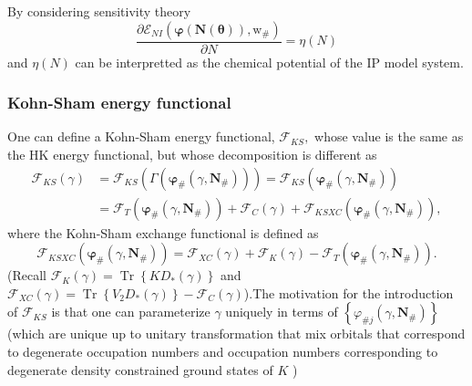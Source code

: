 \documentclass[aps,preprint]{revtex4}%
\begin{document}
By considering sensitivity theory
\begin{equation}
\frac{\partial\mathcal{E}_{NI}\left(  \mathbf{\varphi}\left(  \mathbf{N}%
\left(  \mathbf{\theta}\right)  \right)  \mathbf{,}\mathrm{w}_{\#}\right)
}{\partial N}=\eta\left(  N\right)
\end{equation}
and $\eta\left(  N\right)  $ can be interpretted as the chemical potential of
the IP model system.

\subsubsection{Kohn-Sham energy functional}

One can define a Kohn-Sham energy functional, $\mathcal{F}_{KS},$ whose value
is the same as the HK energy functional, but whose decomposition is different
as
\begin{align}
\mathcal{F}_{KS}\left(  \gamma\right)   &  =\mathcal{F}_{KS}\left(
\Gamma\left(  \mathbf{\varphi}_{\#}\left(  \gamma,\mathbf{N}_{\#}\right)
\right)  \right)  =\mathcal{F}_{KS}\left(  \mathbf{\varphi}_{\#}\left(
\gamma,\mathbf{N}_{\#}\right)  \right) \nonumber\\
&  =\mathcal{F}_{T}\left(  \mathbf{\varphi}_{\#}\left(  \gamma,\mathbf{N}%
_{\#}\right)  \right)  +\mathcal{F}_{C}\left(  \gamma\right)  +\mathcal{F}%
_{KSXC}\left(  \mathbf{\varphi}_{\#}\left(  \gamma,\mathbf{N}_{\#}\right)
\right)  ,
\end{align}
where the Kohn-Sham exchange functional is defined as
\begin{equation}
\mathcal{F}_{KSXC}\left(  \mathbf{\varphi}_{\#}\left(  \gamma,\mathbf{N}%
_{\#}\right)  \right)  =\mathcal{F}_{XC}\left(  \gamma\right)  +\mathcal{F}%
_{K}\left(  \gamma\right)  -\mathcal{F}_{T}\left(  \mathbf{\varphi}%
_{\#}\left(  \gamma,\mathbf{N}_{\#}\right)  \right)  .
\end{equation}
(Recall $\mathcal{F}_{K}\left(  \gamma\right)  =\operatorname{Tr}\left\{
KD_{\ast}\left(  \gamma\right)  \right\}  $ and $\mathcal{F}_{XC}\left(
\gamma\right)  =\operatorname{Tr}\left\{  V_{2}D_{\ast}\left(  \gamma\right)
\right\}  -\mathcal{F}_{C}\left(  \gamma\right)  $)$.$The motivation for the
introduction of $\mathcal{F}_{KS}$ is that one can parameterize $\gamma$
uniquely in terms of $\left\{  \varphi_{\#j}\left(  \gamma,\mathbf{N}%
_{\#}\right)  \right\}  $ (which are unique up to unitary transformation that
mix orbitals that correspond to degenerate occupation numbers and occupation
numbers corresponding to degenerate density constrained ground states of $K$ )
\end{document}
